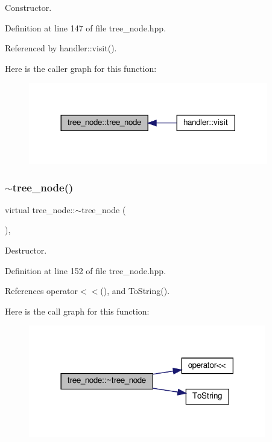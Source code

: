 Constructor. 



Definition at line 147 of file tree\+\_\+node.\+hpp.



Referenced by handler\+::visit().

Here is the caller graph for this function\+:
\nopagebreak
\begin{figure}[H]
\begin{center}
\leavevmode
\includegraphics[width=296pt]{df/dbf/classtree__node_a5e40829fa0df70a89f974c8e6f0242aa_icgraph}
\end{center}
\end{figure}
\mbox{\label{classtree__node_a44550db0a707dd886f968eff42bb681c}} 
\subsubsection{\texorpdfstring{$\sim$tree\+\_\+node()}{~tree\_node()}}
{\footnotesize\ttfamily virtual tree\+\_\+node\+::$\sim$tree\+\_\+node (\begin{DoxyParamCaption}{ }\end{DoxyParamCaption})\hspace{0.3cm}{\ttfamily [inline]}, {\ttfamily [virtual]}}



Destructor. 



Definition at line 152 of file tree\+\_\+node.\+hpp.



References operator$<$$<$(), and To\+String().

Here is the call graph for this function\+:
\nopagebreak
\begin{figure}[H]
\begin{center}
\leavevmode
\includegraphics[width=294pt]{df/dbf/classtree__node_a44550db0a707dd886f968eff42bb681c_cgraph}
\end{center}
\end{figure}



